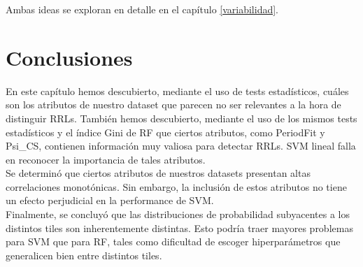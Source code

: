 Ambas ideas se exploran en detalle en el capítulo \ref{variabilidad}. 

\section{Conclusiones}

En este capítulo hemos descubierto, mediante el uso de tests estadísticos, cuáles son los atributos de nuestro dataset que parecen no ser relevantes a la hora de distinguir RRLs. También hemos descubierto, mediante el uso de los mismos tests estadísticos y el índice Gini de RF que ciertos atributos, como PeriodFit y Psi\_CS, contienen información muy valiosa para detectar RRLs. SVM lineal falla en reconocer la importancia de tales atributos. \\

Se determinó que ciertos atributos de nuestros datasets presentan altas correlaciones monotónicas. Sin embargo, la inclusión de estos atributos no tiene un efecto perjudicial en la performance de SVM. \\

Finalmente, se concluyó que las distribuciones de probabilidad subyacentes a los distintos tiles son inherentemente distintas. Esto podría traer mayores problemas para SVM que para RF, tales como dificultad de escoger hiperparámetros que generalicen bien entre distintos tiles. \\


